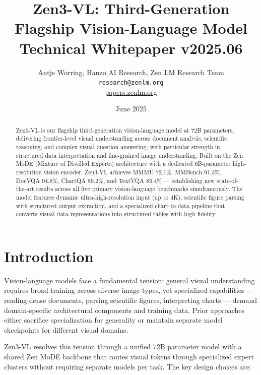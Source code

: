 \documentclass[11pt,a4paper]{article}
\title{\textbf{Zen3-VL: Third-Generation Flagship Vision-Language Model}\\
\large Technical Whitepaper v2025.06}
\author{Antje Worring, Hanzo AI Research, Zen LM Research Team\\
\texttt{research@zenlm.org}\\
\href{https://papers.zenlm.org}{papers.zenlm.org}}
\date{June 2025}
\begin{document}
\maketitle

\begin{abstract}
Zen3-VL is our flagship third-generation vision-language model at 72B parameters,
delivering frontier-level visual understanding across document analysis, scientific
reasoning, and complex visual question answering, with particular strength in structured
data interpretation and fine-grained image understanding. Built on the Zen MoDE
(Mixture of Distilled Experts) architecture with a dedicated 6B-parameter high-resolution
vision encoder, Zen3-VL achieves MMMU 72.1\%, MMBench 91.3\%, DocVQA 94.8\%,
ChartQA 89.2\%, and TextVQA 85.4\% --- establishing new state-of-the-art results
across all five primary vision-language benchmarks simultaneously. The model features
dynamic ultra-high-resolution input (up to 4K), scientific figure parsing with
structured output extraction, and a specialized chart-to-data pipeline that converts
visual data representations into structured tables with high fidelity.
\end{abstract}

\tableofcontents
\newpage

\section{Introduction}
\label{sec:intro}

Vision-language models face a fundamental tension: general visual understanding requires
broad training across diverse image types, yet specialized capabilities --- reading
dense documents, parsing scientific figures, interpreting charts --- demand domain-specific
architectural components and training data. Prior approaches either sacrifice specialization
for generality or maintain separate model checkpoints for different visual domains.

Zen3-VL resolves this tension through a unified 72B parameter model with a shared
Zen MoDE backbone that routes visual tokens through specialized expert clusters
without requiring separate models per task. The key design choices are:
\end{document}
